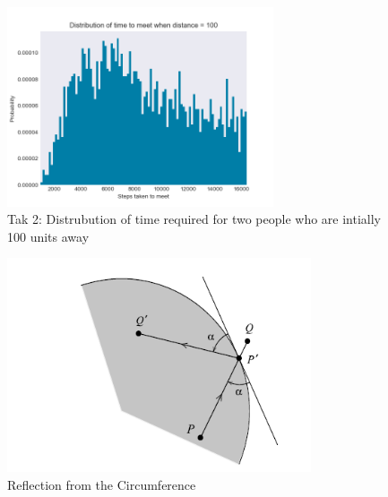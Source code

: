 \documentclass[a4paper, 11pt]{book} %
\begin{document}
\begin{figure}[h]
	\centering
	\includegraphics[width=0.7\textwidth]{task 2.png}
	\caption{Tak 2: Distrubution of time required for two people who are intially 100 units away}
	\label{fig:task2}
\end{figure}
\begin{figure}[h]
	\centering
	\includegraphics[width=0.8\textwidth]{ReflectionRule.png}
	\caption{Reflection from the Circumference}
	\label{fig:reflectionrule}
\end{figure}
\end{document}
